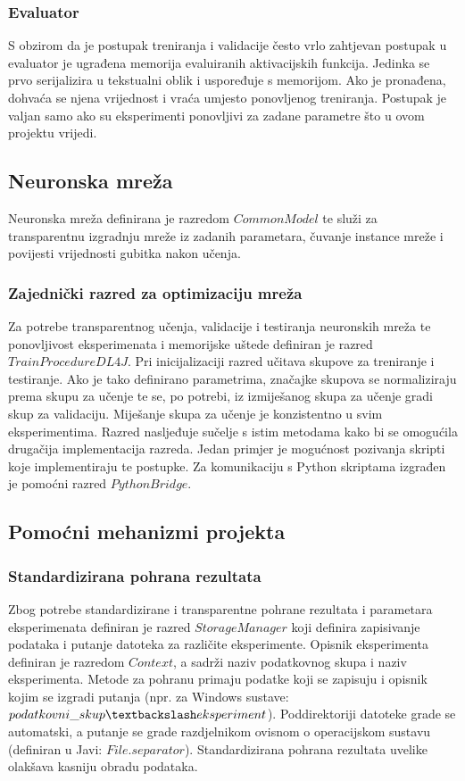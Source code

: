 \documentclass[times, utf8, numeric, diplomski]{fer}
\begin{document}
\subsubsection{Evaluator}
S obzirom da je postupak treniranja i validacije često vrlo zahtjevan postupak u evaluator je ugrađena memorija evaluiranih aktivacijskih funkcija. Jedinka se prvo serijalizira u tekstualni oblik i uspoređuje s memorijom. Ako je pronađena, dohvaća se njena vrijednost i vraća umjesto ponovljenog treniranja. Postupak je valjan samo ako su eksperimenti ponovljivi za zadane parametre što u ovom projektu vrijedi.

\subsection{Neuronska mreža}
Neuronska mreža definirana je razredom $CommonModel$ te služi za transparentnu izgradnju mreže iz zadanih parametara, čuvanje instance mreže i povijesti vrijednosti gubitka nakon učenja.

\subsubsection{Zajednički razred za optimizaciju mreža}
Za potrebe transparentnog učenja, validacije i testiranja neuronskih mreža te ponovljivost eksperimenata i memorijske uštede definiran je razred $TrainProcedureDL4J$. Pri inicijalizaciji razred učitava skupove za treniranje i testiranje. Ako je tako definirano parametrima, značajke skupova se normaliziraju prema skupu za učenje te se, po potrebi, iz izmiješanog skupa za učenje gradi skup za validaciju. Miješanje skupa za učenje je konzistentno u svim eksperimentima.
Razred nasljeđuje sučelje s istim metodama kako bi se omogućila drugačija implementacija razreda. Jedan primjer je mogućnost pozivanja skripti koje implementiraju te postupke. Za komunikaciju s Python skriptama izgrađen je pomoćni razred $PythonBridge$.

\subsection{Pomoćni mehanizmi projekta}

\subsubsection{Standardizirana pohrana rezultata}
Zbog potrebe standardizirane i transparentne pohrane rezultata i parametara eksperimenata definiran je razred $StorageManager$ koji definira zapisivanje podataka i putanje datoteka za različite eksperimente. Opisnik eksperimenta definiran je razredom $Context$, a sadrži naziv podatkovnog skupa i naziv eksperimenta. Metode za pohranu primaju podatke koji se zapisuju i opisnik kojim se izgradi putanja (npr. za Windows sustave: $podatkovni\_skup \textbackslash eksperiment$). Poddirektoriji datoteke grade se automatski, a putanje se grade razdjelnikom ovisnom o operacijskom sustavu (definiran u Javi: $File.separator$). Standardizirana pohrana rezultata uvelike olakšava kasniju obradu podataka.
\end{document}
